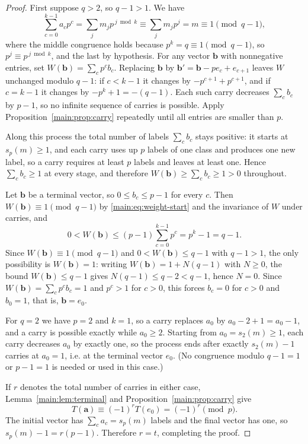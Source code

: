 \documentclass[11pt]{article}
\theoremstyle{definition}
\theoremstyle{remark}
\numberwithin{equation}{section}
\numberwithin{figure}{section}
\begin{document}
\begin{proof}
First suppose $q>2$, so $q-1>1$.  We have
\begin{equation}\label{main:eq:weight-start}
 \sum_{c=0}^{k-1}a_cp^c
 =\sum_jm_jp^{\,j\bmod k}
 \equiv\sum_jm_jp^j=m\equiv1\pmod{q-1},
\end{equation}
where the middle congruence holds because $p^k=q\equiv1\pmod{q-1}$, so $p^j\equiv p^{\,j\bmod k}$, and the last by hypothesis.
For any vector $\mathbf b$ with nonnegative entries, set $W(\mathbf b)=\sum_cp^cb_c$.  Replacing $\mathbf b$ by $\mathbf b'=\mathbf b-pe_c+e_{c+1}$ leaves $W$ unchanged modulo $q-1$: if $c<k-1$ it changes by $-p^{c+1}+p^{c+1}$, and if $c=k-1$ it changes by $-p^k+1=-(q-1)$.  Each such carry decreases $\sum_cb_c$ by $p-1$, so no infinite sequence of carries is possible.  Apply Proposition~\ref{main:prop:carry} repeatedly until all entries are smaller than $p$.

Along this process the total number of labels $\sum_cb_c$ stays positive: it starts at $s_p(m)\ge1$, and each carry uses up $p$ labels of one class and produces one new label, so a carry requires at least $p$ labels and leaves at least one.  Hence $\sum_cb_c\ge1$ at every stage, and therefore $W(\mathbf b)\ge\sum_cb_c\ge1>0$ throughout.

Let $\mathbf b$ be a terminal vector, so $0\le b_c\le p-1$ for every $c$.  Then $W(\mathbf b)\equiv1\pmod{q-1}$ by \eqref{main:eq:weight-start} and the invariance of $W$ under carries, and
\[
 0<W(\mathbf b)\le(p-1)\sum_{c=0}^{k-1}p^c=p^k-1=q-1.
\]
Since $W(\mathbf b)\equiv1\pmod{q-1}$ and $0<W(\mathbf b)\le q-1$ with $q-1>1$, the only possibility is $W(\mathbf b)=1$: writing $W(\mathbf b)=1+N(q-1)$ with $N\ge0$, the bound $W(\mathbf b)\le q-1$ gives $N(q-1)\le q-2<q-1$, hence $N=0$.  Since $W(\mathbf b)=\sum_cp^cb_c=1$ and $p^c>1$ for $c>0$, this forces $b_c=0$ for $c>0$ and $b_0=1$, that is, $\mathbf b=e_0$.

For $q=2$ we have $p=2$ and $k=1$, so a carry replaces $a_0$ by $a_0-2+1=a_0-1$, and a carry is possible exactly while $a_0\ge2$.  Starting from $a_0=s_2(m)\ge1$, each carry decreases $a_0$ by exactly one, so the process ends after exactly $s_2(m)-1$ carries at $a_0=1$, i.e. at the terminal vector $e_0$.  (No congruence modulo $q-1=1$ or $p-1=1$ is needed or used in this case.)

If $r$ denotes the total number of carries in either case, Lemma~\ref{main:lem:terminal} and Proposition~\ref{main:prop:carry} give
\[
 T(\mathbf a)\equiv(-1)^rT(e_0)=(-1)^r\pmod p.
\]
The initial vector has $\sum_ca_c=s_p(m)$ labels and the final vector has one, so $s_p(m)-1=r(p-1)$.  Therefore $r=t$, completing the proof.
\end{proof}
\end{document}
